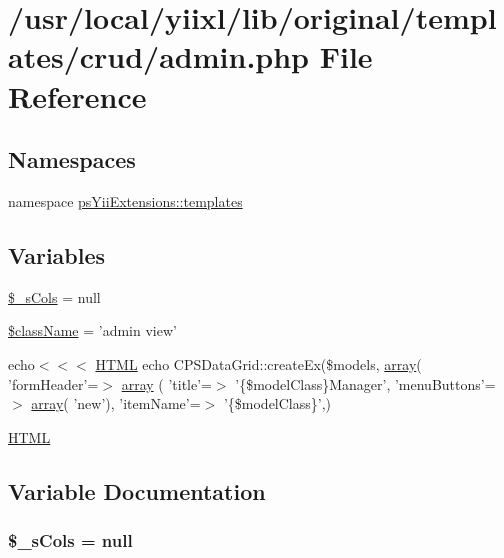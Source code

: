 \hypertarget{admin_8php}{
\section{/usr/local/yiixl/lib/original/templates/crud/admin.php File Reference}
\label{admin_8php}
}
\subsection*{Namespaces}
\begin{DoxyCompactItemize}
\item 
namespace \hyperlink{namespacepsYiiExtensions_1_1templates}{psYiiExtensions::templates}
\end{DoxyCompactItemize}
\subsection*{Variables}
\begin{DoxyCompactItemize}
\item 
\hyperlink{admin_8php_ac7fee519d8f9e7616d91e089ce18a5ac}{\$\_\-sCols} = null
\item 
\hyperlink{admin_8php_acd6a475a6eeb092f4eea3e19e502d67d}{\$className} = 'admin view'
\item 
echo$<$$<$$<$ \hyperlink{module_8php_a2c8135527015cd4586959ac7c2ffec92}{HTML} echo CPSDataGrid::createEx(\$models, \hyperlink{list_8php_aa3205d038c7f8feb5c9f01ac4dfadc88}{array}( 'formHeader'=$>$ \hyperlink{admin_8php_a2394bd91cde70158acb50a4a7f860ab5}{array} ( 'title'=$>$ '\{\$modelClass\}Manager', 'menuButtons'=$>$ \hyperlink{list_8php_aa3205d038c7f8feb5c9f01ac4dfadc88}{array}( 'new'), 'itemName'=$>$ '\{\$modelClass\}',)
\item 
\hyperlink{admin_8php_a2c8135527015cd4586959ac7c2ffec92}{HTML}
\end{DoxyCompactItemize}


\subsection{Variable Documentation}
\hypertarget{admin_8php_ac7fee519d8f9e7616d91e089ce18a5ac}{
\subsubsection[{\$\_\-sCols}]{\setlength{\rightskip}{0pt plus 5cm}\$\_\-sCols = null}}
\label{admin_8php_ac7fee519d8f9e7616d91e089ce18a5ac}


